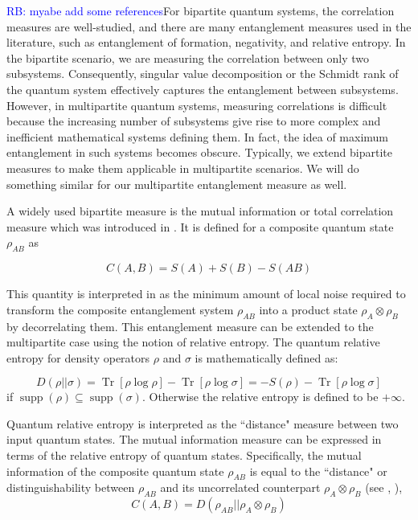 \documentclass{article}
\newcommand{\rb}[1]{{\textcolor{blue}{RB: #1}}}
\DeclareMathOperator{\Tr}{Tr}
\newcommand{\brackets}[1]{\left[ #1 \right]}
\newcommand{\trace}[1]{\Tr \brackets{ #1 }}
\DeclareMathOperator{\supp}{supp}
\begin{document}
\rb{myabe add some references}For bipartite quantum systems, the correlation measures are well-studied, and there are many entanglement measures used in the literature, such as entanglement of formation, negativity, and relative entropy. In the bipartite scenario, we are measuring the correlation between only two subsystems. Consequently, singular value decomposition or the Schmidt rank of the quantum system effectively captures the entanglement between subsystems. However, in multipartite quantum systems, measuring correlations is difficult because the increasing number of subsystems give rise to more complex and inefficient mathematical systems defining them. In fact, the idea of maximum entanglement in such systems becomes obscure. Typically, we extend bipartite measures to make them applicable in multipartite scenarios. We will do something similar for our multipartite entanglement measure as well.

A widely used bipartite measure is the mutual information or total correlation measure which was introduced in \cite{cerf1998information}. It is defined for a composite quantum state $\rho_{AB}$ as 

\begin{equation}
\label{eq:total_correlation_bipartite}
C(A, B) = S(A) + S(B) - S(AB)
\end{equation}

This quantity is interpreted in \cite{wintercorrelations} as the minimum amount of local noise required to transform the composite entanglement system $\rho_{AB}$ into a product state $\rho_A \otimes \rho_B$ by decorrelating them. This entanglement measure can be extended to the multipartite case using the notion of relative entropy. The quantum relative entropy for density operators $\rho$ and $\sigma$ is mathematically defined as:

\begin{equation}
\label{eq:relative_entropy}
D(\rho || \sigma) = \trace{\rho \log \rho} - \trace{\rho \log \sigma} = -S(\rho) - \trace{\rho \log \sigma} 
\end{equation}
if $\supp(\rho) \subseteq \supp(\sigma)$. Otherwise the relative entropy is defined to be $+ \infty$.

Quantum relative entropy is interpreted as the ``distance" measure between two input quantum states. The mutual information measure can be expressed in terms of the relative entropy of quantum states. Specifically, the mutual information of the composite quantum state $\rho_{AB}$ is equal to the ``distance" or distinguishability between $\rho_{AB}$ and its uncorrelated counterpart $\rho_A \otimes \rho_B$ (see \cite{vderal1998relativeentropy}, \cite{vedral2002relativeentropy}), 
\begin{equation}
\label{eq:equality_of_RE_total_correlation}
    C(A, B) = D(\rho_{AB} || \rho_A \otimes \rho_B)
\end{equation}
\end{document}
